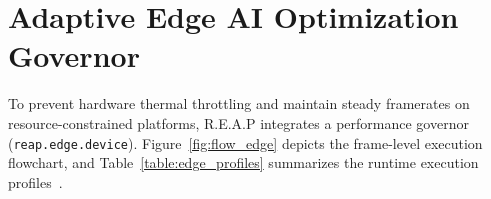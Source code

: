 \documentclass[12pt]{report}
\begin{document}
\section{Adaptive Edge AI Optimization Governor}
To prevent hardware thermal throttling and maintain steady framerates on resource-constrained platforms, R.E.A.P integrates a performance governor (\texttt{reap.edge.device}). Figure~\ref{fig:flow_edge} depicts the frame-level execution flowchart, and Table~\ref{table:edge_profiles} summarizes the runtime execution profiles~\cite{lewin2017mobile}.

\begin{table}[htbp]
    \centering
    \caption{Edge Execution Profiles}
    \label{table:edge_profiles}
    \footnotesize
\end{table}
\end{document}
